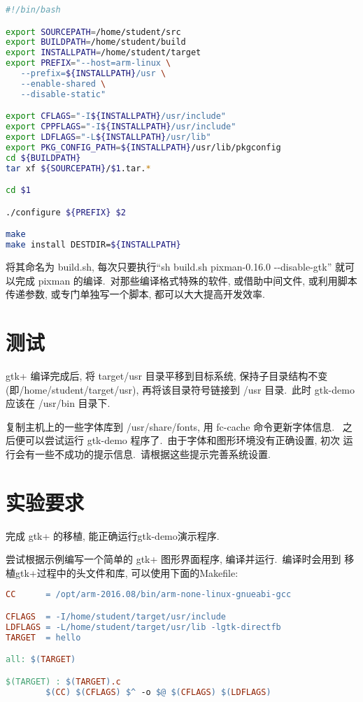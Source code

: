 \lstset{showspaces=false}
\lstset{numbers=none,columns=flexible} 
\lstset{frameround=fttt,frame=trBL}
\begin{lstlisting}[language=bash]
#!/bin/bash

export SOURCEPATH=/home/student/src
export BUILDPATH=/home/student/build
export INSTALLPATH=/home/student/target
export PREFIX="--host=arm-linux \
   --prefix=${INSTALLPATH}/usr \
   --enable-shared \
   --disable-static"

export CFLAGS="-I${INSTALLPATH}/usr/include"
export CPPFLAGS="-I${INSTALLPATH}/usr/include"
export LDFLAGS="-L${INSTALLPATH}/usr/lib"
export PKG_CONFIG_PATH=${INSTALLPATH}/usr/lib/pkgconfig
cd ${BUILDPATH}
tar xf ${SOURCEPATH}/$1.tar.*

cd $1

./configure ${PREFIX} $2

make
make install DESTDIR=${INSTALLPATH}
\end{lstlisting}

将其命名为 build.sh, 每次只要执行``sh build.sh pixman-0.16.0 -{}-disable-gtk''
就可以完成 pixman 的编译.~对那些编译格式特殊的软件, 或借助中间文件, 或利用脚本
传递参数, 或专门单独写一个脚本, 都可以大大提高开发效率.

\section{测试}
    gtk+ 编译完成后, 将 target/usr 目录平移到目标系统, 保持子目录结构不变
(即/home/student/target/usr), 再将该目录符号链接到 /usr 目录.~此时 gtk-demo
应该在 /usr/bin 目录下.

    复制主机上的一些字体库到 /usr/share/fonts, 用 fc-cache 命令更新字体信息.
~之后便可以尝试运行 gtk-demo 程序了.~由于字体和图形环境没有正确设置, 初次
运行会有一些不成功的提示信息.~请根据这些提示完善系统设置.

\section{实验要求}
    完成 gtk+ 的移植, 能正确运行gtk-demo演示程序.

    尝试根据示例编写一个简单的 gtk+ 图形界面程序, 编译并运行.~编译时会用到
移植gtk+过程中的头文件和库, 可以使用下面的Makefile:

\begin{lstlisting}[language=make]
CC      = /opt/arm-2016.08/bin/arm-none-linux-gnueabi-gcc

CFLAGS  = -I/home/student/target/usr/include
LDFLAGS = -L/home/student/target/usr/lib -lgtk-directfb
TARGET  = hello

all: $(TARGET)

$(TARGET) : $(TARGET).c
        $(CC) $(CFLAGS) $^ -o $@ $(CFLAGS) $(LDFLAGS)

\end{lstlisting}
